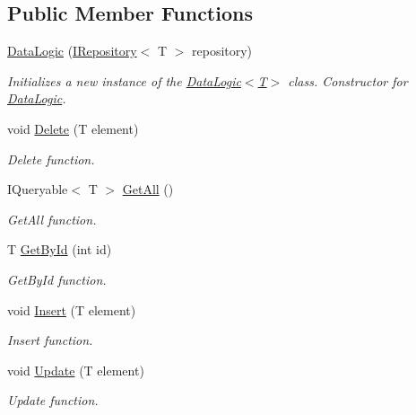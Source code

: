 \subsection*{Public Member Functions}
\begin{DoxyCompactItemize}
\item 
\mbox{\hyperlink{class_game_1_1_data_logic_a137d81328f6aa97c7b1b79b8dd83e314}{Data\+Logic}} (\mbox{\hyperlink{interface_game_1_1_i_repository}{I\+Repository}}$<$ T $>$ repository)
\begin{DoxyCompactList}\small\item\em Initializes a new instance of the \mbox{\hyperlink{class_game_1_1_data_logic_a137d81328f6aa97c7b1b79b8dd83e314}{Data\+Logic$<$\+T$>$}} class. Constructor for \mbox{\hyperlink{class_game_1_1_data_logic}{Data\+Logic}}. \end{DoxyCompactList}\item 
void \mbox{\hyperlink{class_game_1_1_data_logic_a1a919012486b42981b057a6efdb1a188}{Delete}} (T element)
\begin{DoxyCompactList}\small\item\em Delete function. \end{DoxyCompactList}\item 
I\+Queryable$<$ T $>$ \mbox{\hyperlink{class_game_1_1_data_logic_a24de2c5361397d7e477e043573df7ee4}{Get\+All}} ()
\begin{DoxyCompactList}\small\item\em Get\+All function. \end{DoxyCompactList}\item 
T \mbox{\hyperlink{class_game_1_1_data_logic_ab414dd82a9450ffe7f6eb9c59b0bb191}{Get\+By\+Id}} (int id)
\begin{DoxyCompactList}\small\item\em Get\+By\+Id function. \end{DoxyCompactList}\item 
void \mbox{\hyperlink{class_game_1_1_data_logic_ad8b9080bf8b772b0df540668d3052c84}{Insert}} (T element)
\begin{DoxyCompactList}\small\item\em Insert function. \end{DoxyCompactList}\item 
void \mbox{\hyperlink{class_game_1_1_data_logic_a8264b0558379ab47f0c1715664781731}{Update}} (T element)
\begin{DoxyCompactList}\small\item\em Update function. \end{DoxyCompactList}\end{DoxyCompactItemize}


